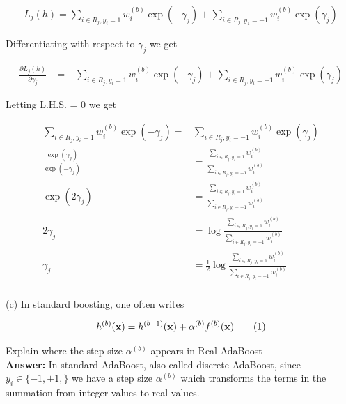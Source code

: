 \documentclass[11pt]{article}
\newcommand\numberthis{\addtocounter{equation}{1}\tag{\theequation}}
\begin{document}
    \begin{align*}
        L_j(h) = \sum_{i \in R_j, y_i = 1} w^{(b)}_i \exp (-\gamma_j) + \sum_{i \in R_j, y_1 = -1}
        w^{(b)}_i \exp (\gamma_j)
    \end{align*}

    Differentiating with respect to $\gamma_j$ we get

    \begin{align*}
        \frac{\partial L_j(h)}{\partial \gamma_j}
        &= -\sum_{i \in R_j, y_i = 1} w^{(b)}_i \exp(-\gamma_j) + \sum_{i \in R_j, y_i = -1}
        w^{(b)}_i \exp(\gamma_j)
    \end{align*}

    Letting L.H.S. = 0 we get 

    \begin{align*}
        \sum_{i \in R_j, y_i = 1} w^{(b)}_i \exp (-\gamma_j) 
        =& \sum_{i \in R_j, y_i = -1} w^{(b)}_i \exp (\gamma_j) \\ 
        \frac{\exp(\gamma_j)}{\exp(-\gamma_j)}
         &= \frac{\sum_{i \in R_j, y_i = 1}w^{(b)}_i}{\sum_{i \in R_j, y_i = -1}w^{(b)}_i} \\ 
         \exp(2 \gamma_j)
         &= \frac{\sum_{i \in R_j, y_i = 1}w^{(b)}_i}{\sum_{i \in R_j, y_i = -1}w^{(b)}_i} \\ 
         2\gamma_j
         &= \log \frac{\sum_{i \in R_j, y_i = 1}w^{(b)}_i}{\sum_{i \in R_j, y_i = -1}w^{(b)}_i} \\ 
         \gamma_j 
         &= \frac{1}{2} \log \frac{\sum_{i \in R_j, y_i = 1}w^{(b)}_i}{\sum_{i \in R_j, y_i = -1}w^{(b)}_i} \\ 
    \end{align*}

    (c) In standard boosting, one often writes

    \begin{align*}
        h^{(b)}(\mathbf{x}) = h^{(b - 1)}(\mathbf{x}) + \alpha^{(b)}f^{(b)}(\mathbf{x}) \numberthis
    \end{align*}

    Explain where the step size $\alpha^{(b)}$ appears in Real AdaBoost \\

    \textbf{Answer:} In standard AdaBoost, also called discrete AdaBoost, since $y_i \in \{-1,
    +1,\}$ we have a step size $\alpha^{(b)}$ which transforms the terms in the summation from
    integer values to real values. \\ 
\end{document}

